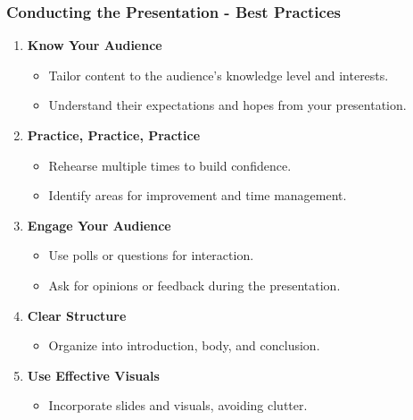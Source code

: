 \documentclass{beamer}
\begin{document}
\begin{frame}[fragile]
    \frametitle{Conducting the Presentation - Best Practices}
    \begin{enumerate}
        \item \textbf{Know Your Audience} 
            \begin{itemize}
                \item Tailor content to the audience's knowledge level and interests.
                \item Understand their expectations and hopes from your presentation.
            \end{itemize}
        \item \textbf{Practice, Practice, Practice}
            \begin{itemize}
                \item Rehearse multiple times to build confidence.
                \item Identify areas for improvement and time management.
            \end{itemize}
        \item \textbf{Engage Your Audience}
            \begin{itemize}
                \item Use polls or questions for interaction.
                \item Ask for opinions or feedback during the presentation.
            \end{itemize}
        \item \textbf{Clear Structure}
            \begin{itemize}
                \item Organize into introduction, body, and conclusion.
            \end{itemize}
        \item \textbf{Use Effective Visuals}
            \begin{itemize}
                \item Incorporate slides and visuals, avoiding clutter.
            \end{itemize}
    \end{enumerate}
\end{frame}
\end{document}

